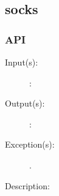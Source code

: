 %
%
%
%
%              

\subsection{socks}
\label{socks}

\subsubsection{API}
\begin{description}
\label{socks_}
\item[{\cfunc[]{socks\_}{}}: ]
	\begin{description}\item[]
	\item[Input(s): ]
		\begin{description}\item[]
		\item[: ]
		\end{description}
	\item[Output(s): ]
		\begin{description}\item[]
		\item[: ]
		\end{description}
	\item[Exception(s): ]
		\begin{description}\item[]
		\item[.]
		\end{description}
	\item[Description: ]
	\end{description}
\end{description}
